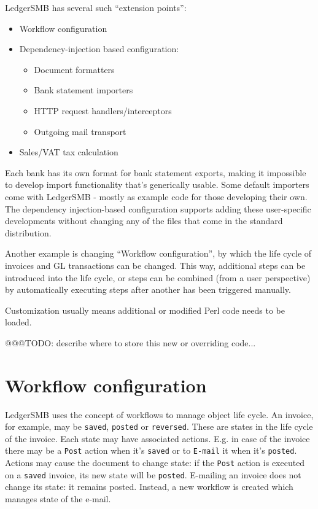 LedgerSMB has several such ``extension points'':

\begin{itemize}
	\item Workflow configuration
	\item Dependency-injection based configuration:
		\begin{itemize}
			\item Document formatters
			\item Bank statement importers
			\item HTTP request handlers/interceptors
			\item Outgoing mail transport
		\end{itemize}
	\item Sales/VAT tax calculation
\end{itemize}

Each bank has its own format for bank statement exports, making it impossible to develop import functionality that's generically usable.  Some default importers come with LedgerSMB - mostly as example code for those developing their own.  The dependency injection-based configuration supports adding these user-specific developments without changing any of the files that come in the standard distribution.

Another example is changing ``Workflow configuration'', by which the life cycle of invoices and GL transactions can be changed.  This way, additional steps can be introduced into the life cycle, or steps can be combined (from a user perspective) by automatically executing steps after another has been triggered manually.

Customization usually means additional or modified Perl code needs to be loaded. 

@@@TODO: describe where to store this new or overriding code...

\section{Workflow configuration}
\label{sec-customization-workflow-configuration}

LedgerSMB uses the concept of workflows to manage object life cycle.
An invoice, for example, may be \texttt{saved}, \texttt{posted} or \texttt{reversed}.  These
are states in the life cycle of the invoice.  Each state may have associated actions. E.g. in
case of the invoice there may be a \texttt{Post} action when it's \texttt{saved} or to
\texttt{E-mail} it when it's \texttt{posted}.  Actions may cause the document to change state:
if the \texttt{Post} action is executed on a \texttt{saved} invoice, its new state
will be \texttt{posted}.  E-mailing an invoice does not change its state: it
remains posted.  Instead, a new workflow is created which manages state of the e-mail.

